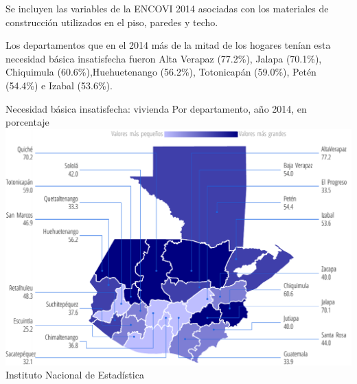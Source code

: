       {%
   Se incluyen las variables de la ENCOVI 2014 asociadas con los materiales de construcción utilizados en el piso, paredes y techo. 
   
   Los departamentos que en el 2014 más de la mitad de los hogares tenían esta necesidad básica insatisfecha fueron Alta Verapaz (77.2\%), Jalapa (70.1\%), Chiquimula (60.6\%),Huehuetenango (56.2\%), Totonicapán (59.0\%), Petén (54.4\%) e Izabal (53.6\%).  }%
      {%
      	Necesidad básica insatisfecha: vivienda
      } %
      {%
      	Por departamento, año 2014, en porcentaje} %
      {%
      	\includegraphics[width=52\cuadri]{graficas/1_12.pdf}}%
      {%
      	Instituto Nacional de Estadística} %
      
      
        
